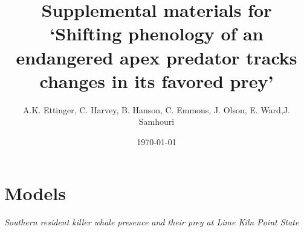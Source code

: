 \documentclass{article}
\begin{document}



\title{Supplemental materials for `Shifting phenology of an endangered apex predator tracks changes in its favored prey'}
\date{\today}
\maketitle
\author{A.K. Ettinger, C. Harvey, B. Hanson, C. Emmons, J. Olson, E. Ward,J. Samhouri}
\renewcommand{\thetable}{S\arabic{table}}
\renewcommand{\thefigure}{S\arabic{figure}}
\section*{Models}
\emph{Southern resident killer whale presence and their prey at Lime Kiln Point State}
\end{document}
